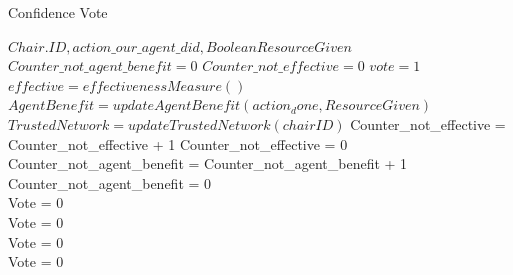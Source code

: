 \begin{algorithm}[htb]
\caption{Confidence Vote}\label{alg:confidence vote}
\begin{algorithmic}
\Require $Chair.ID,action\_our\_agent\_did, Boolean ResourceGiven$
\State $Counter\_not\_agent\_benefit = 0$
\State $Counter\_not\_effective = 0$
\State $vote = 1$ 
\State $effective = effectivenessMeasure()$
\State $AgentBenefit = updateAgentBenefit(action_done, ResourceGiven)$
\State $TrustedNetwork = updateTrustedNetwork(chairID)$
\State Counter\_not\_effective = Counter\_not\_effective + 1
\Else  
\State Counter\_not\_effective = 0
\EndIf
{}
\State Counter\_not\_agent\_benefit = Counter\_not\_agent\_benefit + 1
\Else
\State Counter\_not\_agent\_benefit = 0
\EndIf
{}\\
\Return Vote = 0
\EndIf
{}\\
\Return Vote = 0
\EndIf
{}\\
\Return Vote = 0
\EndIf
{}\\
\Return Vote = 0
\EndIf
\end{algorithmic}
\end{algorithm}



